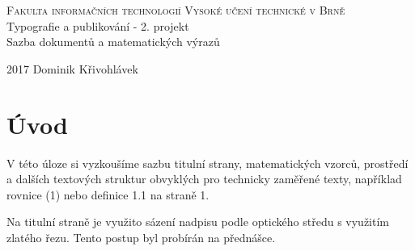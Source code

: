 \documentclass[11pt,twocolumn, a4paper]{article}
\theoremstyle{definition}
\begin{document}
%
\begin{titlepage}
%
\begin{center}
%
\Huge
\textsc{Fakulta informačních technologií
Vysoké učení technické v Brně\\}
%
%
{\LARGE
Typografie a publikování - 2. projekt\\
Sazba dokumentů a matematických výrazů\\}
%
%
\end{center}
{\Large 2017 \hfill Dominik Křivohlávek}

\end{titlepage}

\section*{Úvod}
V této úloze si vyzkoušíme sazbu titulní strany, matematických vzorců, prostředí a dalších textových struktur obvyklých pro technicky zaměřené texty, například rovnice (1) nebo definice 1.1 na straně 1.\par
%
Na titulní straně je využito sázení nadpisu podle optického středu s využitím zlatého řezu. Tento postup byl probírán na přednášce.\par
%
\end{document}
